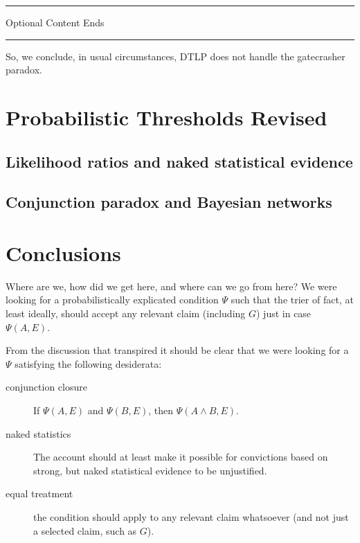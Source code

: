 \documentclass[10pt,dvipsnames,enabledeprecatedfontcommands]{scrartcl}
\newcommand{\et}{\wedge}
\newcommand{\intermezzob}{\nopagebreak 
	\begin{minipage}[c]{13cm}
	\begin{center}\rule{10cm}{0.4pt}

	\tiny{\sc Optional Content Ends}
	
	\vspace{-1mm}
	
	\rule{10cm}{0.4pt}\end{center}
	\end{minipage}
	}
\begin{document}
\intermezzob

So, we conclude, in usual circumstances, DTLP does not handle the
gatecrasher paradox.

\hypertarget{probabilistic-thresholds-revised}{%
\section{Probabilistic Thresholds
Revised}\label{probabilistic-thresholds-revised}}

\hypertarget{likelihood-ratios-and-naked-statistical-evidence}{%
\subsection{Likelihood ratios and naked statistical
evidence}\label{likelihood-ratios-and-naked-statistical-evidence}}

\hypertarget{conjunction-paradox-and-bayesian-networks}{%
\subsection{Conjunction paradox and Bayesian
networks}\label{conjunction-paradox-and-bayesian-networks}}

\hypertarget{conclusions}{%
\section{Conclusions}\label{conclusions}}

Where are we, how did we get here, and where can we go from here? We
were looking for a probabilistically explicated condition \(\Psi\) such
that the trier of fact, at least ideally, should accept any relevant
claim (including \(G\)) just in case \(\Psi(A,E)\).

From the discussion that transpired it should be clear that we were
looking for a \(\Psi\) satisfying the following desiderata:

\begin{description}
\item[conjunction closure] If $\Psi(A,E)$ and $\Psi(B,E)$, then $\Psi(A\et B,E)$.
\item[naked statistics] The account should at least make it possible for convictions based on strong, but naked statistical evidence to be unjustified. 
\item[equal treatment] the condition should apply to any relevant claim whatsoever (and not just a selected claim, such as $G$).
\end{description}
\end{document}

